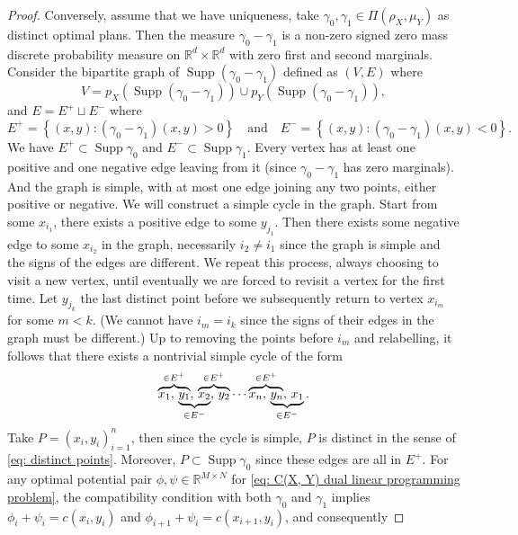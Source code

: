 \documentclass[11pt, oneside, titlepage]{book}
\theoremstyle{plain}
\theoremstyle{definition}
\newcommand{\R}{\mathbb{R}}
\DeclareMathOperator{\supp}{Supp}
\begin{document}
\begin{proof}
    Conversely, assume that we have uniqueness, take $\gamma_0, \gamma_1 \in \Pi(\rho_X, \mu_Y)$ as distinct optimal plans. Then the measure $\gamma_0 - \gamma_1$ is a non-zero signed zero mass discrete probability measure on $\R^d \times \R^d$ with zero first and second marginals. Consider the bipartite graph of $\supp (\gamma_0 - \gamma_1)$ defined as $(V, E)$ where
    \begin{equation*}
        V = p_X(\supp (\gamma_0 - \gamma_1)) \cup p_Y(\supp (\gamma_0 - \gamma_1)),
    \end{equation*}
    and $E = E^+ \sqcup E^-$ where
    \begin{equation*}
        E^+ = \left\{ (x, y) : (\gamma_0 - \gamma_1)(x, y) > 0 \right\} \quad \text{and} \quad E^- = \left\{ (x, y) : (\gamma_0 - \gamma_1)(x, y) < 0 \right\}.
    \end{equation*}
    We have $E^+ \subset \supp \gamma_0$ and $E^- \subset \supp \gamma_1$. Every vertex has at least one positive and one negative edge leaving from it (since $\gamma_0 - \gamma_1$ has zero marginals). And the graph is simple, with at most one edge joining any two points, either positive or negative. We will construct a simple cycle in the graph. Start from some $x_{i_1}$, there exists a positive edge to some $y_{j_1}$. Then there exists some negative edge to some $x_{i_2}$ in the graph, necessarily $i_2 \neq i_1$ since the graph is simple and the signs of the edges are different. We repeat this process, always choosing to visit a new vertex, until eventually we are forced to revisit a vertex for the first time. Let $y_{j_k}$ the last distinct point before we subsequently return to vertex $x_{i_m}$ for some $m<k$. (We cannot have $i_m = i_k$ since the signs of their edges in the graph must be different.) Up to removing the points before $i_m$ and relabelling, it follows that there exists a nontrivial simple cycle of the form
    \begin{equation}
        \lefteqn{\overbrace{\phantom{x_1,\, y_1}}^{\in E^+}} x_1,\, \lefteqn{\underbrace{\phantom{y_1,\, x_2}}_{\in E^-}} y_1,\, \lefteqn{\overbrace{\phantom{x_2,\, y_2}}^{\in E^+}} x_2,\, y_2 \cdots \lefteqn{\overbrace{\phantom{x_n,\, y_n}}^{\in E^+}} x_n,\, \underbrace{y_n,\, x_1}_{\in E^-}.
    \end{equation}
    Take $P = (x_i, y_i)_{i=1}^n$, then since the cycle is simple, $P$ is distinct in the sense of \eqref{eq: distinct points}. Moreover, $P \subset \supp \gamma_0$ since these edges are all in $E^+$. For any optimal potential pair $\phi, \psi \in \R^{M \times N}$ for \eqref{eq: C(X, Y) dual linear programming problem}, the compatibility condition with both $\gamma_0$ and $\gamma_1$ implies $\phi_i + \psi_i = c(x_i, y_i)$ and $\phi_{i+1} + \psi_i = c(x_{i+1}, y_i)$, and consequently

\end{proof}
\end{document}

